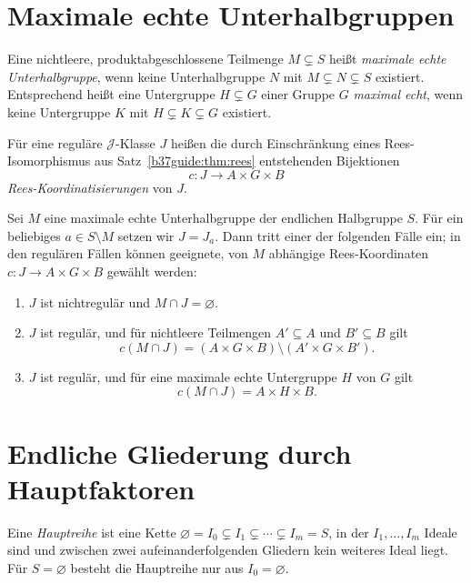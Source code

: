 \clearpage
\section{Maximale echte Unterhalbgruppen}

\begin{definition}
Eine nichtleere, produktabgeschlossene Teilmenge $M\subsetneq S$ heißt
\emph{maximale echte Unterhalbgruppe}, wenn keine Unterhalbgruppe $N$
mit $M\subsetneq N\subsetneq S$ existiert. Entsprechend heißt eine
Untergruppe $H\subsetneq G$ einer Gruppe $G$ \emph{maximal echt}, wenn
keine Untergruppe $K$ mit $H\subsetneq K\subsetneq G$ existiert.

Für eine reguläre $\mathcal J$-Klasse $J$ heißen die durch Einschränkung
eines Rees-Isomorphismus aus Satz~\ref{b37guide:thm:rees} entstehenden
Bijektionen
\[
c:J\longrightarrow A\times G\times B
\]
\emph{Rees-Koordinatisierungen} von $J$.
\end{definition}

\begin{theorem}
\label{b37guide:thm:maximal-subsemigroups}
Sei $M$ eine maximale echte Unterhalbgruppe der endlichen Halbgruppe $S$.
Für ein beliebiges $a\in S\setminus M$ setzen wir $J=J_a$.
Dann tritt einer der folgenden Fälle ein; in den regulären Fällen
können geeignete, von $M$ abhängige Rees-Koordinaten
$c:J\to A\times G\times B$ gewählt werden:
\begin{enumerate}
\item $J$ ist nichtregulär und $M\cap J=\varnothing$.
\item $J$ ist regulär, und für nichtleere Teilmengen $A'\subseteq A$
und $B'\subseteq B$ gilt
\[
c(M\cap J)=(A\times G\times B)\setminus(A'\times G\times B').
\]
\item $J$ ist regulär, und für eine maximale echte Untergruppe $H$ von
$G$ gilt
\[
c(M\cap J)=A\times H\times B.
\]
\end{enumerate}
\cite{graham1968,donoven2018}
\end{theorem}

\section{Endliche Gliederung durch Hauptfaktoren}

\begin{definition}[Hauptreihe]
Eine \emph{Hauptreihe} ist eine Kette
$\varnothing=I_0\subsetneq I_1\subsetneq\cdots\subsetneq I_m=S$,
in der $I_1,\ldots,I_m$ Ideale sind und zwischen zwei aufeinanderfolgenden
Gliedern kein weiteres Ideal liegt. Für $S=\varnothing$ besteht die
Hauptreihe nur aus $I_0=\varnothing$.
\end{definition}

